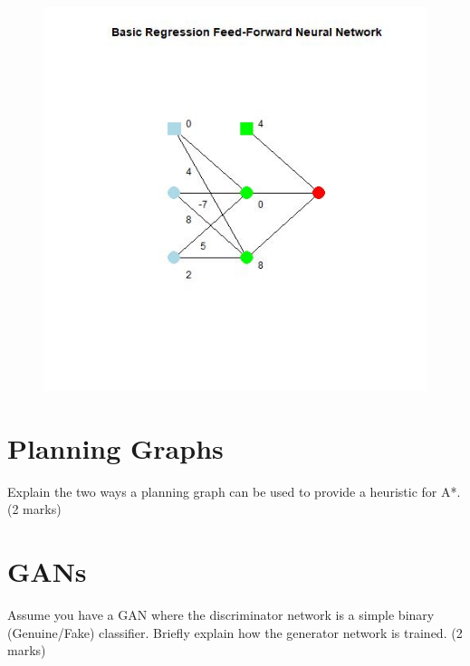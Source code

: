 \documentclass{article}
\begin{document}
\begin{figure}[h!]
\includegraphics[width=\textwidth]{ffnn.jpg}
\end{figure}
\clearpage
\section{ Planning Graphs }

Explain the two ways a planning graph can be used to provide a heuristic for A*. (2 marks)
\clearpage
\section{ GANs }

Assume you have a GAN where the discriminator network is a simple binary (Genuine/Fake) classifier. Briefly explain how the generator network is trained. (2 marks)
\end{document}
